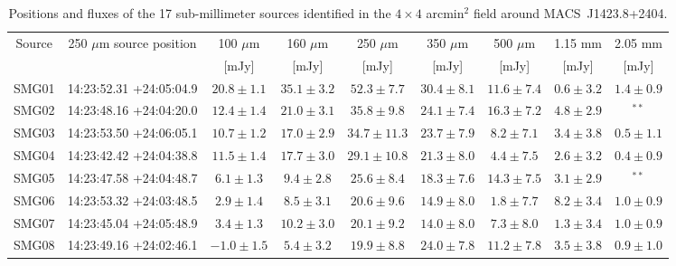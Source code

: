 \documentclass[twocolumn,traditabstract]{aa}
\begin{document}
\begin{table}[h]
\caption{Positions and fluxes of the 17 sub-millimeter sources identified in the $4 \times 4$ arcmin$^2$ field around \mbox{MACS~J1423.8+2404}.}
\begin{center}
\begin{tabular}{ccccccccc}
\hline
\hline
Source & 250 $\mu$m source position & 100 $\mu$m & 160 $\mu$m & 250 $\mu$m & 350 $\mu$m & 500 $\mu$m & 1.15 mm & 2.05 mm \\
 &  & [mJy] & [mJy] & [mJy] & [mJy] & [mJy] & [mJy] & [mJy] \\
\hline
SMG01 & 14:23:52.31 +24:05:04.9 & $    20.8 \pm      1.1$ & $    35.1 \pm      3.2$ & $    52.3 \pm      7.7$ & $    30.4 \pm      8.1$ & $    11.6 \pm      7.4$ & $     0.6 \pm      3.2$ & $     1.4 \pm      0.9$ \\
SMG02 & 14:23:48.16 +24:04:20.0 & $    12.4 \pm      1.4$ & $    21.0 \pm      3.1$ & $    35.8 \pm      9.8$ & $    24.1 \pm      7.4$ & $    16.3 \pm      7.2$ & $     4.8 \pm      2.9$ & $^{**}$ \\
SMG03 & 14:23:53.50 +24:06:05.1 & $    10.7 \pm      1.2$ & $    17.0 \pm      2.9$ & $    34.7 \pm     11.3$ & $    23.7 \pm      7.9$ & $     8.2 \pm      7.1$ & $     3.4 \pm      3.8$ & $     0.5 \pm      1.1$ \\
SMG04 & 14:23:42.42 +24:04:38.8 & $    11.5 \pm      1.4$ & $    17.7 \pm      3.0$ & $    29.1 \pm     10.8$ & $    21.3 \pm      8.0$ & $     4.4 \pm      7.5$ & $     2.6 \pm      3.2$ & $     0.4 \pm      0.9$ \\
SMG05 & 14:23:47.58 +24:04:48.7 & $     6.1 \pm      1.3$ & $     9.4 \pm      2.8$ & $    25.6 \pm      8.4$ & $    18.3 \pm      7.6$ & $    14.3 \pm      7.5$ & $     3.1 \pm      2.9$ & $^{**}$ \\
SMG06 & 14:23:53.32 +24:03:48.5 & $     2.9 \pm      1.4$ & $     8.5 \pm      3.1$ & $    20.6 \pm      9.6$ & $    14.9 \pm      8.0$ & $     1.8 \pm      7.7$ & $     8.2 \pm      3.4$ & $     1.0 \pm      0.9$ \\
SMG07 & 14:23:45.04 +24:05:48.9 & $     3.4 \pm      1.3$ & $    10.2 \pm      3.0$ & $    20.1 \pm      9.2$ & $    14.0 \pm      8.0$ & $     7.3 \pm      8.0$ & $     1.3 \pm      3.4$ & $     1.0 \pm      0.9$ \\
SMG08 & 14:23:49.16 +24:02:46.1 & $    -1.0 \pm      1.5$ & $     5.4 \pm      3.2$ & $    19.9 \pm      8.8$ & $    24.0 \pm      7.8$ & $    11.2 \pm      7.8$ & $     3.5 \pm      3.8$ & $     0.9 \pm      1.0$ \\

\end{tabular}
\end{center}
\end{table}
\end{document}
